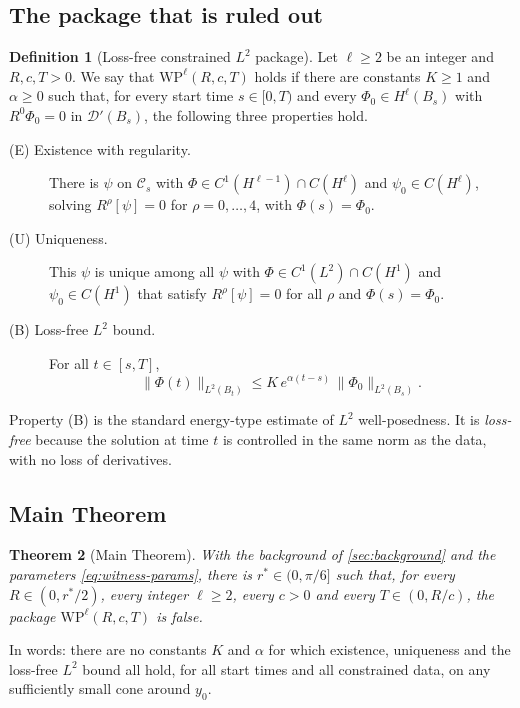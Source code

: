 \documentclass[11pt]{article}
\theoremstyle{plain}
\newtheorem{theorem}{Theorem}[section]
\theoremstyle{definition}
\newtheorem{definition}[theorem]{Definition}
\theoremstyle{remark}
\newcommand{\Ccal}{\mathcal{C}}
\newcommand{\WP}{\mathrm{WP}}
\begin{document}
\subsection{The package that is ruled out}\label{sec:package}

\begin{definition}[Loss-free constrained $L^2$ package]\label{def:package}
Let $\ell \ge 2$ be an integer and $R, c, T > 0$. We say that $\WP^\ell(R,c,T)$ holds if there are constants $K \ge 1$ and $\alpha \ge 0$ such that, for every start time $s \in [0,T)$ and every $\Phi_0 \in H^\ell(B_s)$ with $R^0\Phi_0 = 0$ in $\mathcal{D}'(B_s)$, the following three properties hold.
\begin{description}
  \item[(E) Existence with regularity.] There is $\psi$ on $\Ccal_s$ with $\Phi \in C^1(H^{\ell-1}) \cap C(H^\ell)$ and $\psi_0 \in C(H^\ell)$, solving $R^\rho[\psi] = 0$ for $\rho = 0,\dots,4$, with $\Phi(s) = \Phi_0$.
  \item[(U) Uniqueness.] This $\psi$ is unique among all $\psi$ with $\Phi \in C^1(L^2)\cap C(H^1)$ and $\psi_0 \in C(H^1)$ that satisfy $R^\rho[\psi] = 0$ for all $\rho$ and $\Phi(s) = \Phi_0$.
  \item[(B) Loss-free $L^2$ bound.] For all $t \in [s,T]$,
  \[
    \|\Phi(t)\|_{L^2(B_t)} \le K\,e^{\alpha(t-s)}\,\|\Phi_0\|_{L^2(B_s)} .
  \]
\end{description}
\end{definition}

Property (B) is the standard energy-type estimate of $L^2$ well-posedness. It is \emph{loss-free} because the solution at time $t$ is controlled in the same norm as the data, with no loss of derivatives.

\subsection{Main Theorem}\label{sec:main-theorem}

\begin{theorem}[Main Theorem]\label{thm:main}
With the background of \cref{sec:background} and the parameters \eqref{eq:witness-params}, there is $r^* \in (0,\pi/6]$ such that, for every $R \in (0, r^*/2)$, every integer $\ell \ge 2$, every $c > 0$ and every $T \in (0, R/c)$, the package $\WP^\ell(R,c,T)$ is false.
\end{theorem}

In words: there are no constants $K$ and $\alpha$ for which existence, uniqueness and the loss-free $L^2$ bound all hold, for all start times and all constrained data, on any sufficiently small cone around $y_0$.
\end{document}
